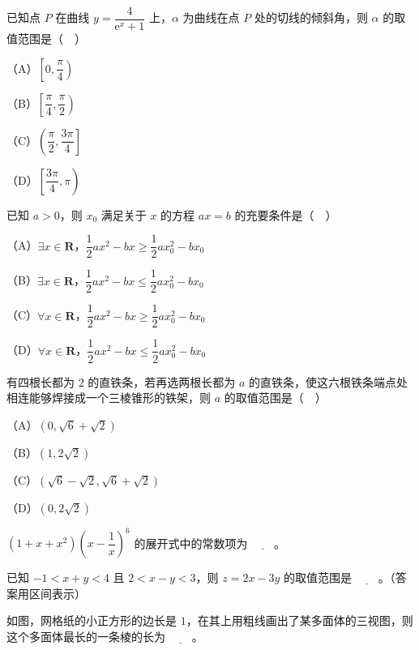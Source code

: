 \begin{question}
已知点 $P$ 在曲线 $y=\dfrac{4}{\mathrm e^x+1}$ 上，$\alpha$ 为曲线在点 $P$ 处的切线的倾斜角，则 $\alpha$ 的取值范围是（　）

（A）$\left[0,\dfrac{\pi}{4}\right)$

（B）$\left[\dfrac{\pi}{4},\dfrac{\pi}{2}\right)$

（C）$\left(\dfrac{\pi}{2},\dfrac{3\pi}{4}\right]$

（D）$\left[\dfrac{3\pi}{4},\pi\right)$

\end{question}
\begin{question}
已知 $a>0$，则 $x_0$ 满足关于 $x$ 的方程 $ax=b$ 的充要条件是（　）

（A）$\exists x\in\mathbf R$，$\dfrac12ax^2-bx\geqslant\dfrac12ax_0^2-bx_0$

（B）$\exists x\in\mathbf R$，$\dfrac12ax^2-bx\leqslant\dfrac12ax_0^2-bx_0$

（C）$\forall x\in\mathbf R$，$\dfrac12ax^2-bx\geqslant\dfrac12ax_0^2-bx_0$

（D）$\forall x\in\mathbf R$，$\dfrac12ax^2-bx\leqslant\dfrac12ax_0^2-bx_0$

\end{question}
\begin{question}
有四根长都为 $2$ 的直铁条，若再选两根长都为 $a$ 的直铁条，使这六根铁条端点处相连能够焊接成一个三棱锥形的铁架，则 $a$ 的取值范围是（　）

（A）$(0,\sqrt6+\sqrt2)$

（B）$(1,2\sqrt2)$

（C）$(\sqrt6-\sqrt2,\sqrt6+\sqrt2)$

（D）$(0,2\sqrt2)$

\end{question}
\begin{question}
$(1+x+x^2)\left(x-\dfrac1x\right)^6$ 的展开式中的常数项为 $\underline{\qquad}$。

\end{question}
\begin{question}
已知 $-1<x+y<4$ 且 $2<x-y<3$，则 $z=2x-3y$ 的取值范围是 $\underline{\qquad}$。（答案用区间表示）

\Needspace{0.4\textheight}
\end{question}
\begingroup
\renewenvironment{question}{\Needspace{0.5\textheight}}{}
\begin{question}
如图，网格纸的小正方形的边长是 $1$，在其上用粗线画出了某多面体的三视图，则这个多面体最长的一条棱的长为 $\underline{\qquad}$。
\nopagebreak[4]
\begin{center}\end{center}
\nopagebreak[4]
\end{question}
